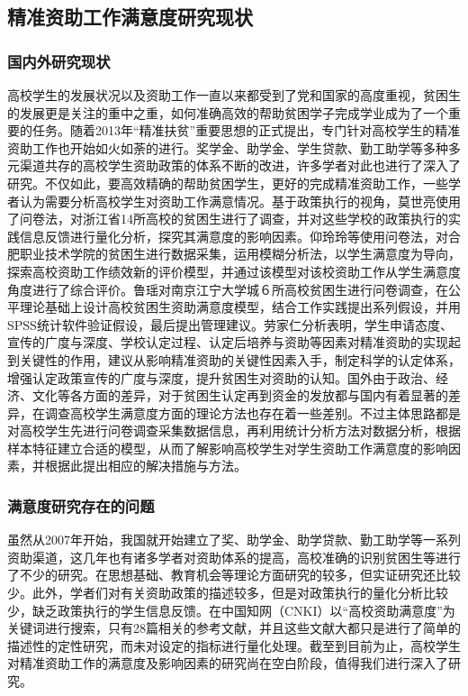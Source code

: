 \documentclass[UTF8,a4paper,12pt]{ctexart}  %
\begin{document}
\hypertarget{section-2}{%
\subsection{精准资助工作满意度研究现状}\label{section-2}}

\hypertarget{section-3}{%
\subsubsection{国内外研究现状}\label{section-3}}

高校学生的发展状况以及资助工作一直以来都受到了党和国家的高度重视，贫困生的发展更是关注的重中之重，如何准确高效的帮助贫困学子完成学业成为了一个重要的任务。随着2013年``精准扶贫''重要思想的正式提出，专门针对高校学生的精准资助工作也开始如火如荼的进行。奖学金、助学金、学生贷款、勤工助学等多种多元渠道共存的高校学生资助政策的体系不断的改进，许多学者对此也进行了深入了研究。不仅如此，要高效精确的帮助贫困学生，更好的完成精准资助工作，一些学者认为需要分析高校学生对资助工作满意情况。基于政策执行的视角，莫世亮使用了问卷法，对浙江省14所高校的贫困生进行了调查，并对这些学校的政策执行的实践信息反馈进行量化分析，探究其满意度的影响因素\citep{莫世亮2014}。仰玲玲等使用问卷法，对合肥职业技术学院的贫困生进行数据采集，运用模糊分析法，以学生满意度为导向，探索高校资助工作绩效新的评价模型，并通过该模型对该校资助工作从学生满意度角度进行了综合评价\citep{仰玲玲2017}。鲁瑶对南京江宁大学城６所高校贫困生进行问卷调查，在公平理论基础上设计高校贫困生资助满意度模型，结合工作实践提出系列假设，并用SPSS统计软件验证假设，最后提出管理建议\citep{鲁瑶2018}。劳家仁分析表明，学生申请态度、宣传的广度与深度、学校认定过程、认定后培养与资助等因素对精准资助的实现起到关键性的作用，建议从影响精准资助的关键性因素入手，制定科学的认定体系，增强认定政策宣传的广度与深度，提升贫困生对资助的认知\citep{劳家仁2019}。国外由于政治、经济、文化等各方面的差异，对于贫困生认定再到资金的发放都与国内有着显著的差异，在调查高校学生满意度方面的理论方法也存在着一些差别。不过主体思路都是对高校学生先进行问卷调查采集数据信息，再利用统计分析方法对数据分析，根据样本特征建立合适的模型，从而了解影响高校学生对学生资助工作满意度的影响因素，并根据此提出相应的解决措施与方法。

\hypertarget{section-4}{%
\subsubsection{满意度研究存在的问题}\label{section-4}}

虽然从2007年开始，我国就开始建立了奖、助学金、助学贷款、勤工助学等一系列资助渠道，这几年也有诸多学者对资助体系的提高，高校准确的识别贫困生等进行了不少的研究。在思想基础、教育机会等理论方面研究的较多，但实证研究还比较少。此外，学者们对有关资助政策的描述较多，但是对政策执行的量化分析比较少，缺乏政策执行的学生信息反馈。在中国知网（CNKI）以``高校资助满意度''为关键词进行搜索，只有28篇相关的参考文献，并且这些文献大都只是进行了简单的描述性的定性研究，而未对设定的指标进行量化处理。截至到目前为止，高校学生对精准资助工作的满意度及影响因素的研究尚在空白阶段，值得我们进行深入了研究\citep{陈宗霞2019}。
\end{document}
